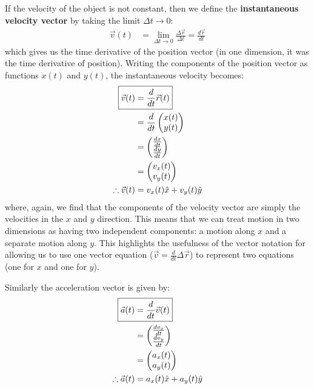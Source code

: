 If the velocity of the object is not constant, then we define the \textbf{instantaneous velocity vector} by taking the limit $\Delta t\to 0$:
\begin{align}
\vec v(t) &= \lim_{\Delta t \to 0}\frac{\Delta \vec r}{\Delta t}=\frac{d\vec r}{dt}
\end{align}
which gives us the time derivative of the position vector (in one dimension, it was the time derivative of position). Writing the components of the position vector as functions $x(t)$ and $y(t)$, the instantaneous velocity becomes:
\begin{align}
\label{eqn:DescribingMotionInND:vvecdef}
\Aboxed{\vec v(t) &=\frac{d}{dt}\vec r(t) }\\
&=\frac{d}{dt} \begin{pmatrix}
           x(t) \\
           y(t) \\
         \end{pmatrix}\nonumber\\ 
&=\begin{pmatrix}
           \frac{dx}{dt}  \\
          \frac{dy}{dt}  \\
         \end{pmatrix}\nonumber\\ 
 &=\begin{pmatrix}
           v_x(t) \\
           v_y(t) \\
         \end{pmatrix}\nonumber\\   
\therefore \vec v(t) &= v_x(t)\hat x+v_y(t)\hat y  \nonumber     
\end{align}
where, again, we find that the components of the velocity vector are simply the velocities in the $x$ and $y$ direction. This means that we can treat motion in two dimensions as having two independent components: a motion along $x$ and a separate motion along $y$. This highlights the usefulness of the vector notation for allowing us to use one vector equation ($\vec v=\frac{d}{dt}\Delta \vec r$) to represent two equations (one for $x$ and one for $y$). 

Similarly the acceleration vector is given by:
\begin{align}
\label{eqn:DescribingMotionInND:avecdef}
\Aboxed{\vec a(t) &= \frac{d}{dt}\vec v(t)} \\
&=\begin{pmatrix}
           \frac{dv_x}{dt}  \\
          \frac{dv_y}{dt}  \\
         \end{pmatrix}\nonumber\\
&=\begin{pmatrix}
           a_x(t) \\
           a_y(t) \\
         \end{pmatrix}\nonumber\\
\therefore \vec a(t) &= a_x(t)\hat x+a_y(t)\hat y      \nonumber        
\end{align}

